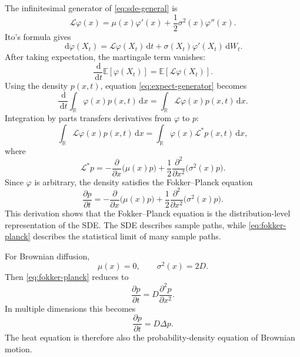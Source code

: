 \documentclass[11pt,a4paper]{article}
\numberwithin{equation}{section}
\newcommand{\R}{\mathbb{R}}
\newcommand{\E}{\mathbb{E}}
\newcommand{\dd}{\,\mathrm{d}}
\begin{document}
The infinitesimal generator of \eqref{eq:sde-general} is
\begin{equation}
  \mathcal{L}\varphi(x)
  =\mu(x)\varphi'(x)
  +\frac{1}{2}\sigma^2(x)\varphi''(x).
  \label{eq:generator}
\end{equation}
Ito's formula gives
\begin{equation}
  \dd\varphi(X_t)
  =\mathcal{L}\varphi(X_t)\dd t
  +\sigma(X_t)\varphi'(X_t)\dd W_t.
  \label{eq:ito}
\end{equation}
After taking expectation, the martingale term vanishes:
\begin{equation}
  \frac{\dd}{\dd t}\E[\varphi(X_t)]
  =\E[\mathcal{L}\varphi(X_t)].
  \label{eq:expect-generator}
\end{equation}
Using the density \(p(x,t)\), equation \eqref{eq:expect-generator} becomes
\begin{equation}
  \frac{\dd}{\dd t}\int_{\R}\varphi(x)p(x,t)\dd x
  =
  \int_{\R}\mathcal{L}\varphi(x)p(x,t)\dd x.
  \label{eq:weak-forward}
\end{equation}
Integration by parts transfers derivatives from \(\varphi\) to \(p\):
\begin{equation}
  \int_{\R}\mathcal{L}\varphi(x)p(x,t)\dd x
  =
  \int_{\R}\varphi(x)\mathcal{L}^*p(x,t)\dd x,
  \label{eq:adjoint-definition}
\end{equation}
where
\begin{equation}
  \mathcal{L}^*p
  =
  -\frac{\partial}{\partial x}\bigl(\mu(x)p\bigr)
  +\frac{1}{2}\frac{\partial^2}{\partial x^2}
  \bigl(\sigma^2(x)p\bigr).
  \label{eq:adjoint}
\end{equation}
Since \(\varphi\) is arbitrary, the density satisfies the Fokker--Planck equation
\begin{equation}
  \frac{\partial p}{\partial t}
  =
  -\frac{\partial}{\partial x}\bigl(\mu(x)p\bigr)
  +\frac{1}{2}\frac{\partial^2}{\partial x^2}
  \bigl(\sigma^2(x)p\bigr).
  \label{eq:fokker-planck}
\end{equation}
This derivation shows that the Fokker--Planck equation is the distribution-level representation of the SDE. The SDE describes sample paths, while \eqref{eq:fokker-planck} describes the statistical limit of many sample paths.

For Brownian diffusion,
\begin{equation}
  \mu(x)=0,
  \qquad
  \sigma^2(x)=2D.
  \label{eq:brownian-coefficients}
\end{equation}
Then \eqref{eq:fokker-planck} reduces to
\begin{equation}
  \frac{\partial p}{\partial t}
  =D\frac{\partial^2p}{\partial x^2}.
  \label{eq:heat-1d}
\end{equation}
In multiple dimensions this becomes
\begin{equation}
  \frac{\partial p}{\partial t}=D\Delta p.
  \label{eq:heat-nd}
\end{equation}
The heat equation is therefore also the probability-density equation of Brownian motion.
\end{document}
